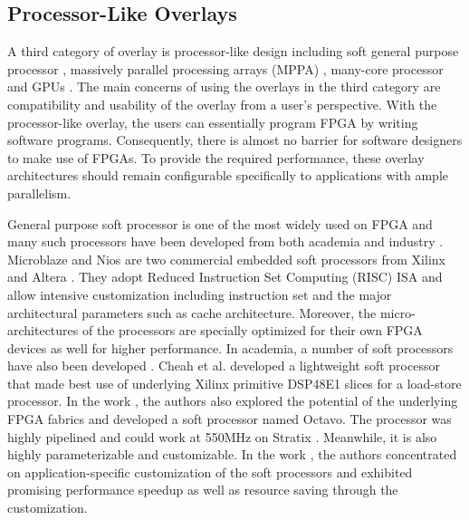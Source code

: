 \subsection{Processor-Like Overlays}
A third category of overlay is processor-like design including soft general purpose processor \cite{microblaze, nios, cheah2012iDEA, laforest2012OCTAVO, yiannacouras2007exploration}, massively parallel processing arrays (MPPA) \cite{anjam2010vliw, hannig2014invasive, boppu2014compact}, many-core processor \cite{lebedev2010MARC} and GPUs \cite{jeffrey2011potential}. The main concerns of using the overlays in the third category are compatibility and usability of the overlay from a user's perspective. With the processor-like overlay, the users can essentially program FPGA by writing software programs. Consequently, there is almost no barrier for software designers to make use of FPGAs. To provide the required performance, these overlay architectures should remain configurable specifically to applications with ample parallelism.

General purpose soft processor is one of the most widely used on FPGA and many such processors have been developed from both academia and industry \cite{microblaze, nios, cheah2012iDEA, laforest2012OCTAVO, yiannacouras2007exploration}. Microblaze and Nios \uppercase\expandafter{} are two commercial embedded soft processors from Xilinx and Altera \cite{microblaze, nios}. They adopt Reduced Instruction Set Computing (RISC) ISA and allow intensive customization including instruction set and the major architectural parameters such as cache architecture. Moreover, the micro-architectures of the processors are specially optimized for their own FPGA devices as well for higher performance. In academia, a number of soft processors have also been developed \cite{cheah2012iDEA, laforest2012OCTAVO}. Cheah et al. developed a lightweight soft processor that made best use of underlying Xilinx primitive DSP48E1 slices for a load-store processor. In the work \cite{laforest2012OCTAVO}, the authors also explored the potential of the underlying FPGA fabrics and developed a soft processor named Octavo. The processor was highly pipelined and could work at 550MHz on Stratix \uppercase\expandafter{}. Meanwhile, it is also highly parameterizable and customizable. In the work \cite{yiannacouras2007exploration}, the authors concentrated on application-specific customization of the soft processors and exhibited promising performance speedup as well as resource saving through the customization.

